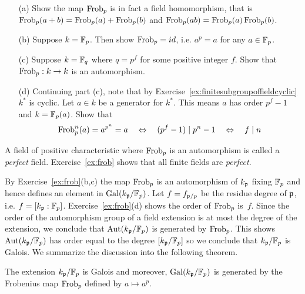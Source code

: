 \begin{exercise}\label{ex:frob}
\hfill
\begin{enumerate}
	\item[(a)]
	Show the map $\operatorname{Frob}_p$ is in fact a field homomorphism,
	that is $\operatorname{Frob}_p(a + b) = \operatorname{Frob}_p(a) + \operatorname{Frob}_p(b)$
	and $\operatorname{Frob}_p(ab) = \operatorname{Frob}_p(a)\operatorname{Frob}_p(b)$.
	
	\item[(b)]
	Suppose $k = \mathbb{F}_p$. Then show $\operatorname{Frob}_p = id$, i.e.
	$a^p = a$ for any $a\in\mathbb{F}_p$.
	
	\item[(c)]
	Suppose $k = \mathbb{F}_{q}$ where $q=p^f$ for some positive
	integer $f$. Show that $\operatorname{Frob}_p:k\to k$ is an automorphism.
	
	\item[(d)]
	Continuing part (c), note that by
	Exercise~\ref{ex:finitesubgroupoffieldcyclic}
	$k^*$ is cyclic. Let $a\in k$ be a generator for
	$k^*$. This means $a$ has order $p^f-1$ and $k = \mathbb{F}_p(a)$.
	Show that
	$$
	\operatorname{Frob}_p^n(a) = a^{p^n} = a
	\quad\Leftrightarrow\quad
	(p^f - 1) \mid p^n - 1
	\quad\Leftrightarrow\quad
	f \mid n
	$$
\end{enumerate}
\end{exercise}

\begin{remark}
	A field of positive characteristic where $\operatorname{Frob}_p$
	is an automorphism is called a \emph{perfect} field.
	Exercise~\ref{ex:frob} shows that all finite fields
	are \emph{perfect}.
\end{remark}

By Exercise~\ref{ex:frob}(b,c) the map $\operatorname{Frob}_p$ is an
automorphism of $k_{\mathfrak{p}}$ fixing $\mathbb{F}_p$ and hence defines
an element in $\operatorname{Gal}(k_{\mathfrak{p}}/\mathbb{F}_p)$. Let $f = f_{\mathfrak{p}/p}$ be the residue
degree of $\mathfrak{p}$, i.e. $f = [k_{\mathfrak{p}}:\mathbb{F}_p]$.
Exercise~\ref{ex:frob}(d) shows the order of $\operatorname{Frob}_p$ is~$f$.
Since the order of the automorphism group of a field extension
is at most the degree of the extension, we conclude that
$\operatorname{Aut}(k_{\mathfrak{p}}/\mathbb{F}_p)$ is generated by $\operatorname{Frob}_p$. This shows
$\operatorname{Aut}(k_{\mathfrak{p}}/\mathbb{F}_p)$ has order equal to the degree $[k_{\mathfrak{p}}/\mathbb{F}_p]$
so we conclude that $k_{\mathfrak{p}}/\mathbb{F}_p$ is Galois.
We summarize the discussion into the following theorem.

\begin{theorem}\label{thm:galoisgroupfinitefield}
	The extension $k_{\mathfrak{p}}/\mathbb{F}_p$ is Galois and moreover,
	$\operatorname{Gal}(k_{\mathfrak{p}}/\mathbb{F}_p)$ is generated by the Frobenius map
	$\operatorname{Frob}_p$ defined by $a\mapsto a^p$.
\end{theorem}

